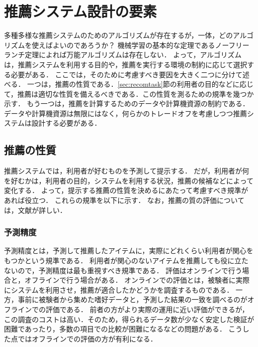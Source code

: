 \chapter{推薦システム設計の要素}
\label{chap:design}

多種多様な推薦システムのためのアルゴリズムが存在するが，一体，どのアルゴリズムを使えばよいのであろうか？
機械学習の基本的な定理であるノーフリーランチ定理によれば万能アルゴリズムは存在しない．
よって，アルゴリズムは，推薦システムを利用する目的や，推薦を実行する環境の制約に応じて選択する必要がある．
ここでは，そのために考慮すべき要因を大きく二つに分けて述べる．
一つは，推薦の性質である．\ref{sec:recomtask}節の利用者の目的などに応じて，推薦は適切な性質を備えるべきである．この性質を測るための規準を幾つか示す．
もう一つは，推薦を計算するためのデータや計算機資源の制約である．データや計算機資源は無限にはなく，何らかのトレードオフを考慮しつつ推薦システムは設計する必要がある．

\section{推薦の性質}
\label{sec:recomtype}

推薦システムでは，利用者が好むものを予測して提示する．
だが，利用者が何を好むかは，利用者の目的，システムを利用する状況，推薦の候補などによって変化する．
よって，提示する推薦の性質を決めるにあたって考慮すべき規準があれば役立つ．
これらの規準を以下に示す．
なお，推薦の質の評価については，文献\cite{jacm:04:01,jmlr:09:01}が詳しい．

\subsection{予測精度}
\label{sec:prederr}


予測精度とは，予測して推薦したアイテムに，実際にどれくらい利用者が関心をもつかという規準である．
利用者が関心のないアイテムを推薦しても役に立たないので，予測精度は最も重視すべき規準である\cite{sigir:01:01}．
評価はオンラインで行う場合と，オフラインで行う場合がある．
オンラインでの評価とは，被験者に実際にシステムを利用させ，推薦が適合したかどうかを調査するものである．
一方，事前に被験者から集めた嗜好データと，予測した結果の一致を調べるのがオフラインでの評価である．
前者の方がより実際の運用に近い評価ができるが，この調査のコストは高い．そのため，得られるデータ数が少なく安定した検証が困難であったり，多数の項目での比較が困難になるなどの問題がある．
こうした点ではオフラインでの評価の方が有利になる．

